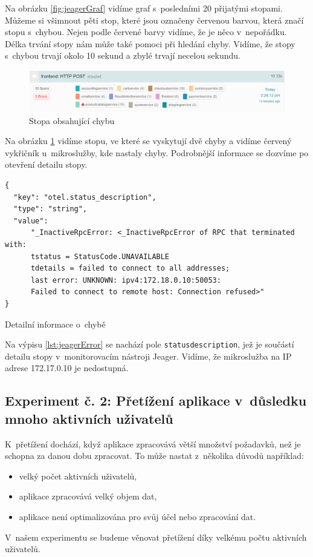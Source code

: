 Na obrázku \ref{fig:jeagerGraf} vidíme graf s~posledními 20 přijatými stopami. Můžeme si všimnout pěti stop, které jsou označeny červenou barvou, která značí stopu s~chybou. Nejen podle červené barvy vidíme, že je něco v~nepořádku. Délka trvání stopy nám může také pomoci při hledání chyby. Vidíme, že stopy s~chybou trvají okolo 10 sekund a zbylé trvají necelou sekundu.

\begin{figure}[H]
  \centering
  \includegraphics[width=15cm]{obrazky-figures/jeagerStopa.png}
  \caption{Stopa obsahující chybu}
  \label{fig:jeagerStopa}
\end{figure}

Na obrázku \ref{fig:jeagerStopa} vidíme stopu, ve které se vyskytují dvě chyby a vidíme červený vykřičník u~mikroslužby, kde nastaly chyby. Podrobnější informace se dozvíme po otevření detailu stopy.

\begin{listing}[H]
    \begin{verbatim}
{
  "key": "otel.status_description",
  "type": "string",
  "value": 
      "_InactiveRpcError: <_InactiveRpcError of RPC that terminated with:
      tstatus = StatusCode.UNAVAILABLE
      tdetails = failed to connect to all addresses; 
      last error: UNKNOWN: ipv4:172.18.0.10:50053: 
      Failed to connect to remote host: Connection refused>"
}
\end{verbatim}
    \caption{Detailní informace o~chybě}
    \label{lst:jeagerError}
\end{listing}

Na výpisu \ref{lst:jeagerError} se nachází pole \texttt{status\textunderscore description}, jež je součástí detailu stopy v~monitorovacím nástroji Jeager. Vidíme, že mikroslužba na IP adrese 172.17.0.10 je nedostupná.


\subsection{Experiment č. 2: Přetížení aplikace v~důsledku mnoho aktivních uživatelů}

K~přetížení dochází, když aplikace zpracovává větší množství požadavků, než je schopna za danou dobu zpracovat. To může nastat z~několika důvodů například:
\begin{itemize}
    \item{velký počet aktivních uživatelů,}
    \item{aplikace zpracovává velký objem dat,}
    \item{aplikace není optimalizována pro svůj účel nebo zpracování dat.}
\end{itemize}
V~našem experimentu se budeme věnovat přetížení díky velkému počtu aktivních uživatelů.

